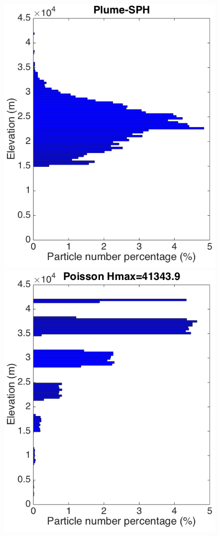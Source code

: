 \begin{figure}[!htb]
\begin{minipage}{.247 \textwidth}
        \includegraphics[width=0.99 \textwidth]{Chapter-7/Figures/Plume-SPH-ParticleDis-z}
    \end{minipage}%
    \begin{minipage}{.247 \textwidth}
        \centering
        \includegraphics[width=0.99 \textwidth]{Chapter-7/Figures/Possion-Hmax40k-ParticleDis-z}

\end{minipage}
\end{figure}

